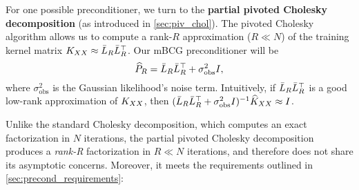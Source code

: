For one possible preconditioner, we turn to the {\bf partial pivoted Cholesky decomposition} (as introduced in \cref{sec:piv_chol}).
The pivoted Cholesky algorithm allows us to compute a rank-$R$ approximation ($R \ll N$) of the training kernel matrix $K_{XX} \approx \bar{L}_{R} \bar{L}_{R}^{\top}$.
Our mBCG preconditioner will be
\begin{equation}
  \widehat{P}_R = \bar{L}_{R} \bar{L}_{R}^\top + \sigma^2_\text{obs} I,
\end{equation}
where $\sigma_\text{obs}^2$ is the Gaussian likelihood's noise term.
Intuitively, if $\bar{L}_{R}\bar{L}_{R}^{\top}$ is a good low-rank approximation of $K_{XX}$, then $(\bar{L}_{R} \bar{L}_R^\top + \sigma_\text{obs}^{2}I)^{-1}\widehat{K}_{XX} \approx I$.


Unlike the standard Cholesky decomposition, which computes an exact factorization in $N$ iterations,
the partial pivoted Cholesky decomposition produces a \emph{rank-R} factorization in $R \ll N$ iterations, and therefore does not share its asymptotic concerns.
Moreover, it meets the requirements outlined in \cref{sec:precond_requirements}:
%
